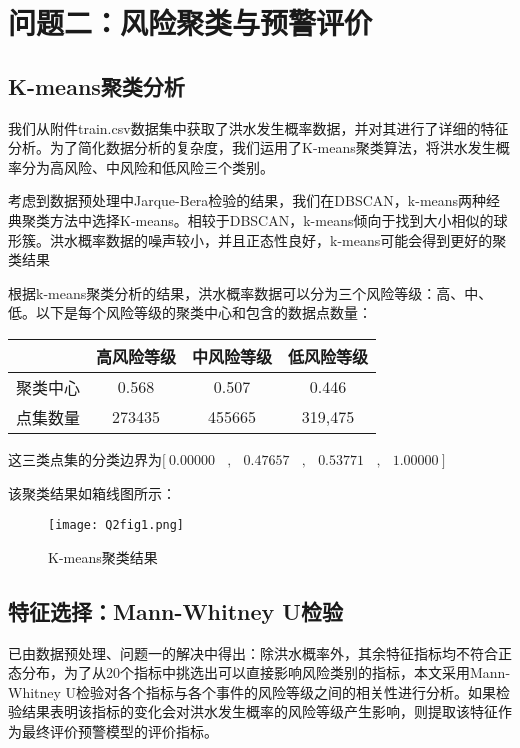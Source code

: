 \documentclass[withoutpreface,bwprint]{cumcmthesis} %
\begin{document}
\section{问题二：风险聚类与预警评价}
\subsection{K-means聚类分析}
我们从附件train.csv数据集中获取了洪水发生概率数据，并对其进行了详细的特征分析。为了简化数据分析的复杂度，我们运用了K-means聚类算法，将洪水发生概率分为高风险、中风险和低风险三个类别。

考虑到数据预处理中Jarque-Bera检验的结果，我们在DBSCAN，k-means两种经典聚类方法中选择K-means。相较于DBSCAN，k-means倾向于找到大小相似的球形簇。洪水概率数据的噪声较小，并且正态性良好，k-means可能会得到更好的聚类结果

根据k-means聚类分析的结果，洪水概率数据可以分为三个风险等级：高、中、低。以下是每个风险等级的聚类中心和包含的数据点数量：


\begin{table}[htbp]
	\centering
	\begin{tabular}{cccc} 
		\toprule
		& 高风险等级  & 中风险等级  & 低风险等级    \\ 
		\hline
		聚类中心 & 0.568  & 0.507  & 0.446    \\
		点集数量 & 273435 & 455665 & 319,475  \\
		\bottomrule
	\end{tabular}
\end{table}

这三类点集的分类边界为$\textbf{[}~0.00000~~~~\textbf{,}~~~~0.47657~~~~\textbf{,}~~~~0.53771~~~~\textbf{,}~~~~1.00000~\textbf{]}$

该聚类结果如箱线图所示：

\begin{figure}[htbp]
	\centering
	\texttt{[image: Q2fig1.png]}
	\caption{K-means聚类结果}
	\label{Q2fig1}
\end{figure}

\subsection{特征选择：Mann-Whitney U检验}
已由数据预处理、问题一的解决中得出：除洪水概率外，其余特征指标均不符合正态分布，为了从20个指标中挑选出可以直接影响风险类别的指标，本文采用Mann-Whitney U检验对各个指标与各个事件的风险等级之间的相关性进行分析。如果检验结果表明该指标的变化会对洪水发生概率的风险等级产生影响，则提取该特征作为最终评价预警模型的评价指标。
\end{document}
